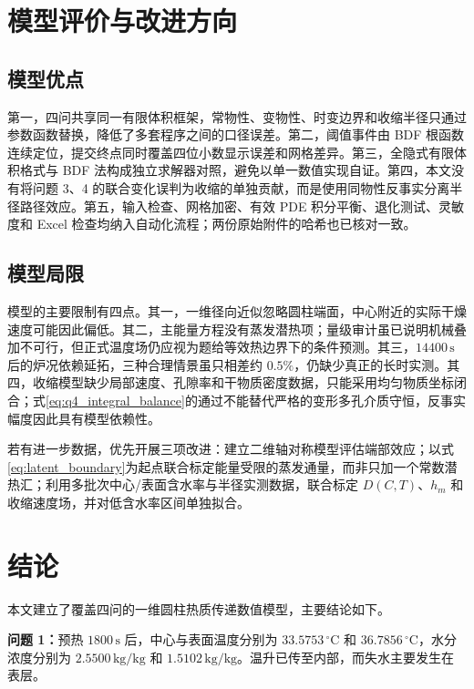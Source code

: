 \documentclass[UTF8,a4paper,zihao=-4,fontset=fandol]{ctexart}
\newcommand{\unit}[1]{\,\mathrm{#1}}
\begin{document}
\section{模型评价与改进方向}

\subsection{模型优点}

第一，四问共享同一有限体积框架，常物性、变物性、时变边界和收缩半径只通过参数函数替换，降低了多套程序之间的口径误差。第二，阈值事件由 BDF 根函数连续定位，提交终点同时覆盖四位小数显示误差和网格差异。第三，全隐式有限体积格式与 BDF 法构成独立求解器对照，避免以单一数值实现自证。第四，本文没有将问题 3、4 的联合变化误判为收缩的单独贡献，而是使用同物性反事实分离半径路径效应。第五，输入检查、网格加密、有效 PDE 积分平衡、退化测试、灵敏度和 Excel 检查均纳入自动化流程；两份原始附件的哈希也已核对一致。

\subsection{模型局限}

模型的主要限制有四点。其一，一维径向近似忽略圆柱端面，中心附近的实际干燥速度可能因此偏低。其二，主能量方程没有蒸发潜热项；量级审计虽已说明机械叠加不可行，但正式温度场仍应视为题给等效热边界下的条件预测。其三，$14400\unit{s}$ 后的炉况依赖延拓，三种合理情景虽只相差约 $0.5\%$，仍缺少真正的长时实测。其四，收缩模型缺少局部速度、孔隙率和干物质密度数据，只能采用均匀物质坐标闭合；式\eqref{eq:q4_integral_balance}的通过不能替代严格的变形多孔介质守恒，反事实幅度因此具有模型依赖性。

若有进一步数据，优先开展三项改进：建立二维轴对称模型评估端部效应；以式\eqref{eq:latent_boundary}为起点联合标定能量受限的蒸发通量，而非只加一个常数潜热汇；利用多批次中心/表面含水率与半径实测数据，联合标定 $D(C,T)$、$h_m$ 和收缩速度场，并对低含水率区间单独拟合。

\section{结论}

本文建立了覆盖四问的一维圆柱热质传递数值模型，主要结论如下。

\textbf{问题 1：}预热 $1800\unit{s}$ 后，中心与表面温度分别为 $33.5753\,^{\circ}\mathrm{C}$ 和 $36.7856\,^{\circ}\mathrm{C}$，水分浓度分别为 $2.5500\unit{kg/kg}$ 和 $1.5102\unit{kg/kg}$。温升已传至内部，而失水主要发生在表层。
\end{document}
